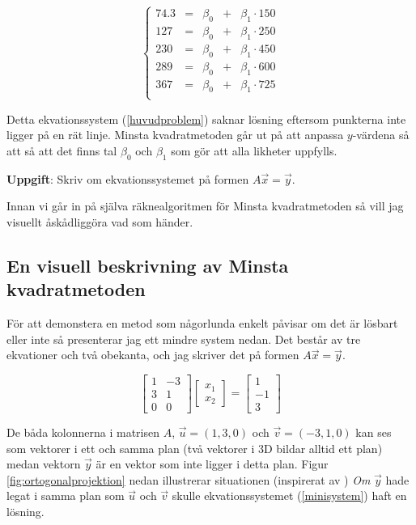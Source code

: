 \documentclass[titlepage, 10pt]{article}
\begin{document}
\begin{equation} \label{huvudproblem}
\left\{\begin{matrix}
74.3 & = & \beta_0  & + & \beta_1 \cdot 150 \\
127 & = & \beta_0 & + & \beta_1 \cdot 250\\
230 & = & \beta_0 & + & \beta_1 \cdot 450\\
289 & = & \beta_0 & + & \beta_1 \cdot 600\\
367 & = & \beta_0 & + & \beta_1 \cdot 725\\
\end{matrix}\right.
\end{equation}

Detta ekvationssystem (\ref{huvudproblem}) saknar lösning eftersom punkterna
inte ligger på en rät linje.
Minsta kvadratmetoden går ut på att anpassa $y$-värdena så att så att det finns
tal $\beta_0$ och $\beta_1$ som gör att alla likheter uppfylls.

\textbf{Uppgift}: Skriv om ekvationssystemet på formen $A\vec{x}=\vec{y}$.

Innan vi går in på själva räknealgoritmen för Minsta kvadratmetoden så vill
jag visuellt åskådliggöra vad som händer.
\subsection{En visuell beskrivning av Minsta kvadratmetoden}

För att demonstera en metod som någorlunda enkelt påvisar om det är lösbart
eller inte så presenterar jag ett mindre system nedan. Det består av tre
ekvationer och två obekanta, och jag skriver det på formen $A\vec{x}=\vec{y}$.

\begin{equation} \label{minisystem}
  \begin{bmatrix}
    1 & -3 \\
    3 &  1 \\
    0 &  0
  \end{bmatrix}
  \begin{bmatrix}
    x_1 \\
    x_2
  \end{bmatrix}
  =
  \begin{bmatrix}
    1 \\
    -1 \\
    3
    \end{bmatrix}
\end{equation}

De båda kolonnerna i matrisen $A$, $\vec{u}=(1, 3, 0)$ och $\vec{v}=(-3, 1, 0)$
kan ses som vektorer i ett och samma plan (två vektorer i 3D bildar alltid ett
plan) medan vektorn $\vec{y}$ är en vektor som inte ligger i detta plan. Figur
\ref{fig:ortogonalprojektion} nedan illustrerar situationen
(inspirerat av \cite[p.~379]{Linalg:1})
\emph{Om} $\vec{y}$
hade legat i samma plan som $\vec{u}$ och $\vec{v}$ skulle ekvationssystemet
(\ref{minisystem}) haft en lösning.
\end{document}
